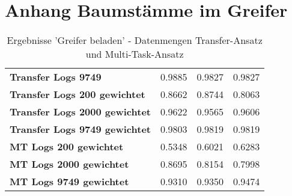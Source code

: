 \chapter{Anhang Baumstämme im Greifer}
\label{appendix:BaumstammImGreifer}

	\begin{table}[ht]
	\centering
	\begin{tabularx}{\textwidth}{llll}
	\rowcolor{Gray}	\textbf{Transfer Logs 9749} 			& 0.9885 & 0.9827 & 0.9827	\\ 
		\textbf{Transfer Logs 200 gewichtet}	& 0.8662 & 0.8744 & 0.8063 	\\		
		\textbf{Transfer Logs 2000 gewichtet}	& 0.9622 & 0.9565 & 0.9606  \\	
		\textbf{Transfer Logs 9749 gewichtet}	& 0.9803 & 0.9819 & 0.9819	\\	
		\textbf{MT Logs 200 gewichtet}	 	    & 0.5348 & 0.6021 & 0.6283 	\\		
		\textbf{MT Logs 2000 gewichtet}	 	    & 0.8695 & 0.8154 & 0.7998 	\\	
		\textbf{MT Logs 9749 gewichtet}	 	    & 0.9310 & 0.9350 & 0.9474  \\	
	\end{tabularx}
	\caption{Ergebnisse 'Greifer beladen' - Datenmengen Transfer-Ansatz und Multi-Task-Ansatz}
	\label{table:Ergebnisse_Transfer_Logs}
\end{table}